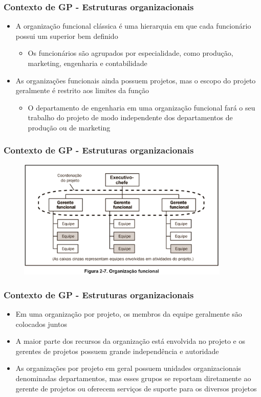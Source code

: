 \begin{frame}
   \frametitle{Contexto de GP
- Estruturas organizacionais}
   \begin{itemize}
    \item A organização funcional clássica é uma hierarquia em que cada funcionário possui um superior bem definido
    \begin{itemize}
     \item Os funcionários são agrupados por especialidade, como produção, marketing, engenharia e contabilidade
    \end{itemize}
    \item As organizações funcionais ainda possuem projetos, mas o escopo do projeto geralmente é restrito aos limites da função
    \begin{itemize}
     \item O departamento de engenharia em uma organização funcional fará o seu trabalho do projeto de modo independente dos departamentos de produção ou de marketing
    \end{itemize}
   \end{itemize}
  \end{frame}
  
\begin{frame}
 \frametitle{Contexto de GP - Estruturas organizacionais}
 \begin{figure}
  \centering
  \includegraphics[width = 0.9\textwidth]{figs/fig1.png}
 \end{figure}
\end{frame}

\begin{frame}
   \frametitle{Contexto de GP
- Estruturas organizacionais}
   \begin{itemize}
    \item Em uma organização por projeto, os membros da equipe geralmente são colocados juntos
    \item A maior parte dos recursos da organização está envolvida no projeto e os gerentes de projetos possuem grande independência e autoridade
    \item As organizações por projeto em geral possuem unidades organizacionais denominadas departamentos, mas esses grupos se reportam diretamente ao gerente de projetos ou oferecem serviços de suporte para os diversos projetos
   \end{itemize}
  \end{frame}

